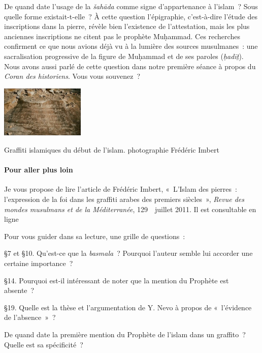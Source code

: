 De quand date l'usage de la \emph{šahāda} comme signe d'appartenance à
l'islam~? Sous quelle forme existait-t-elle~? À cette question
l'épigraphie, c'est-à-dire l'étude des inscriptions dans la pierre,
révèle bien l'existence de l'attestation, mais les plus anciennes
inscriptions ne citent pas le prophète Muḥammad. Ces recherches
confirment ce que nous avions déjà vu à la lumière des sources
musulmanes~: une sacralisation progressive de la figure de Muḥammad et
de ses paroles (\emph{ḥadīṯ}). Nous avons aussi parlé de cette question
dans notre première séance à propos du \emph{Coran des historiens}. Vous
vous souvenez~?
\begin{marginfigure}
    \centering
  \includegraphics[width=1.57639in,height=0.96528in]{Images/image057.jpg}
    \caption{Graffiti islamiques du début de
l'islam. photographie Frédéric
Imbert}
    \label{fig:graffiti}
\end{marginfigure}



\paragraph{Pour aller plus loin}

Je vous propose de lire l'article de Frédéric Imbert, «~L'Islam des
pierres~: l'expression de la foi dans les graffiti arabes des premiers
siècles~», \emph{Revue des mondes musulmans et de la Méditerranée},
129~\textbar~juillet 2011. Il est consultable en ligne 

Pour vous guider dans sa lecture, une grille de questions~:

§7 et §10. Qu'est-ce que la \emph{basmala}~? Pourquoi l'auteur semble
lui accorder une certaine importance~?

§14. Pourquoi est-il intéressant de noter que la mention du Prophète est
absente~?

§19. Quelle est la thèse et l'argumentation de Y. Nevo à propos de
«~l'évidence de l'absence~»~?

De quand date la première mention du Prophète de l'islam dans un
graffito~? Quelle est sa spécificité~? \\
 



